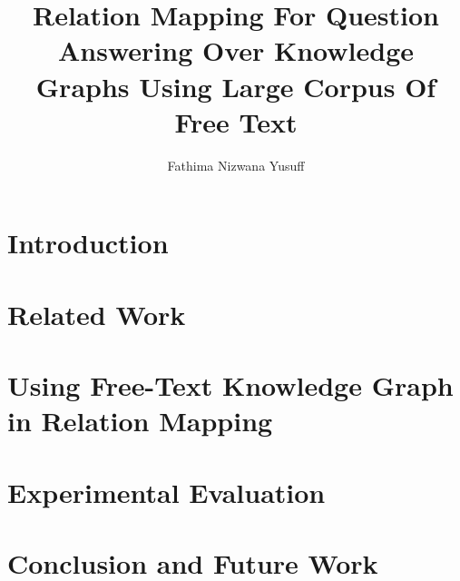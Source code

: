 \documentclass[12pt]{report}
\title{Relation Mapping For Question Answering Over Knowledge Graphs Using Large Corpus Of Free Text}
\author{Fathima Nizwana Yusuff}
\begin{document}
\startingpages
\contentspage

{}
\chapter{Introduction}

\chapter{Related Work}

\chapter{Using Free-Text Knowledge Graph in Relation Mapping}

\chapter{Experimental Evaluation}

\chapter{Conclusion and Future Work}

\end{document}
